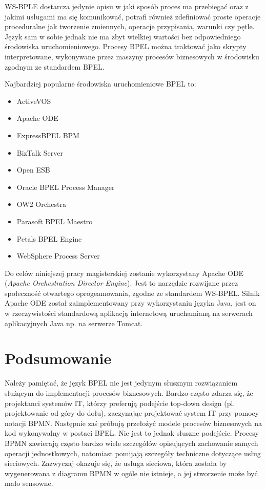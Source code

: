 WS-BPLE dostarcza jedynie opisu w jaki sposób proces ma przebiegać oraz z jakimi usługami ma się komunikować, potrafi również zdefiniować proste operacje proceduralne jak tworzenie zmiennych, operacje przypisania, warunki czy pętle. Język sam w sobie jednak nie ma zbyt wielkiej wartości bez odpowiedniego środowiska uruchomieniowego. Procesy BPEL można traktować jako skrypty interpretowane, wykonywane przez maszyny procesów biznesowych w środowisku zgodnym ze standardem BPEL. 

Najbardziej popularne środowiska uruchomieniowe BPEL to:

\begin{itemize}
\item ActiveVOS 
\item Apache ODE
\item ExpressBPEL BPM
\item BizTalk Server
\item Open ESB
\item Oracle BPEL Process Manager
\item OW2 Orchestra
\item Parasoft BPEL Maestro
\item Petals BPEL Engine
\item WebSphere Process Server
\end{itemize}

Do celów niniejszej pracy magisterskiej zostanie wykorzystany Apache ODE (\textit{Apache Orchestration Director Engine}). Jest to narzędzie rozwijane przez społeczność otwartego oprogeamowania, zgodne ze standardem WS-BPEL. Silnik Apache ODE został zaimplementowany przy wykorzystaniu języka Java, jest on w rzeczywistości standardową aplikacją internetową uruchamianą na serwerach aplikacyjnych Java np. na serwerze Tomcat. 


\section{Podsumowanie}
\label{sec:bpelSummary}

Należy pamiętać, że język BPEL nie jest jedynym słusznym rozwiązaniem służącym do implementacji procesów biznesowych. Bardzo często  zdarza się, że projektanci systemów IT, którzy preferują podejście top-down design (pl. projektowanie od góry do dołu), zaczynając projektować system IT przy pomocy notacji BPMN. Następnie zaś próbują przełożyć modele procesów biznesowych na kod wykonywalny w postaci BPEL. Nie jest to jednak słuszne podejście. Procesy BPMN zawierają często bardzo wiele szczegółów opisujących zachowanie samych operacji jednostkowych, natomiast pomijają szczegóły techniczne dotyczące usług sieciowych.  Zazwyczaj okazuje się, że usługa sieciowa, która została by wygenerowana z diagramu BPMN w ogóle nie istnieje, a jej stworzenie może być mało sensowne.

